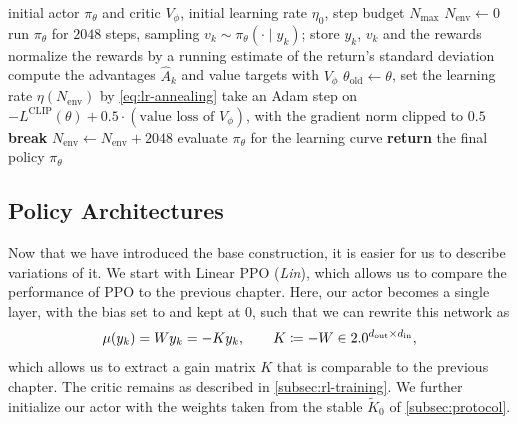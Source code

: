 \begin{algorithm}[htbp]
    \caption{PPO implemented here}
    \label{alg:ppo}
    \begin{algorithmic}[1]
        \REQUIRE initial actor $\pi_{\theta}$ and critic $V_{\phi}$, initial learning rate $\eta_0$, step budget $N_{\max}$
        \STATE $N_{\mathrm{env}} \leftarrow 0$
            \STATE run $\pi_\theta$ for $2048$ steps, sampling $v_k \sim \pi_\theta(\cdot \mid y_k)$; store $y_k$, $v_k$ and the rewards
            \STATE normalize the rewards by a running estimate of the return's standard deviation
            \STATE compute the advantages $\hat{A}_k$ and value targets with $V_\phi$
            \STATE $\theta_{\mathrm{old}} \leftarrow \theta$, \quad set the learning rate $\eta(N_{\mathrm{env}})$ by \eqref{eq:lr-annealing}
                    \STATE take an Adam step on $-L^{\mathrm{CLIP}}(\theta) + 0.5 \cdot (\text{value loss of } V_\phi)$,
                    with the gradient norm clipped to $0.5$
                \ENDFOR
                    \STATE \textbf{break}
                \ENDIF
            \ENDFOR
            \STATE $N_{\mathrm{env}} \leftarrow N_{\mathrm{env}} + 2048$
                \STATE evaluate $\pi_\theta$ for the learning curve
            \ENDIF
        \ENDWHILE
        \STATE \textbf{return} the final policy $\pi_\theta$
    \end{algorithmic}
\end{algorithm}

\subsection{Policy Architectures}
\label{subsec:rl-architectures}

Now that we have introduced the base construction, it is easier for us to describe variations of it. We start with
Linear PPO (\emph{Lin}), which allows us to compare the performance of PPO to the previous chapter. Here, our actor becomes a single layer,
with the bias set to and kept at $0$, such that we can rewrite this network as
\begin{equation}
    \label{eq:linear-ppo}
    \mu(y_k) = W y_k = -K y_k , \qquad K \coloneqq -W \in 2.0^{d_{\mathrm{out}} \times d_{\mathrm{in}}} ,
\end{equation}
which allows us to extract a gain matrix $K$ that is comparable to the previous chapter. The critic remains as described in \cref{subsec:rl-training}.
We further initialize our actor with the weights taken from the stable $\tilde{K}_0$ of \cref{subsec:protocol}.

